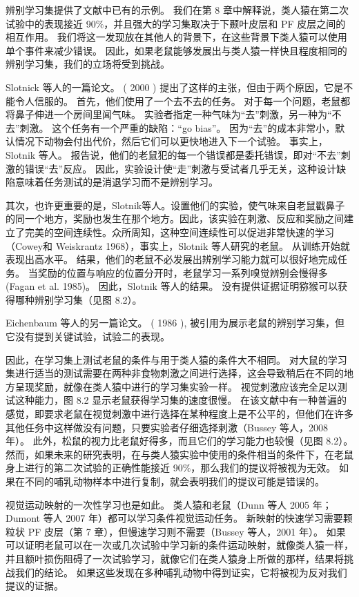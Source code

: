 \par 
辨别学习集提供了文献中已有的示例。 我们在第 8 章中解释说，类人猿在第二次试验中的表现接近 90$\%$，并且强大的学习集取决于下颞叶皮层和 PF 皮层之间的相互作用。 我们将这一发现放在其他人的背景下，在这些背景下类人猿可以使用单个事件来减少错误。 因此，如果老鼠能够发展出与类人猿一样快且程度相同的辨别学习集，我们的立场将受到挑战。
\par 
Slotnick 等人的一篇论文。 ( 2000 ) 提出了这样的主张，但由于两个原因，它是不能令人信服的。 首先，他们使用了一个去不去的任务。 对于每一个问题，老鼠都将鼻子伸进一个房间里闻气味。 实验者指定一种气味为“去”刺激，另一种为“不去”刺激。 这个任务有一个严重的缺陷：“go bias”。 因为“去”的成本非常小，默认情况下动物会付出代价，然后它们可以更快地进入下一个试验。 事实上，Slotnik 等人。 报告说，他们的老鼠犯的每一个错误都是委托错误，即对“不去”刺激的错误“去”反应。 因此，实验设计使“走”刺激与受试者几乎无关，这种设计缺陷意味着任务测试的是消退学习而不是辨别学习。
\par 
其次，也许更重要的是，Slotnik等人。设置他们的实验，使气味来自老鼠戳鼻子的同一个地方，奖励也发生在那个地方。因此，该实验在刺激、反应和奖励之间建立了完美的空间连续性。众所周知，这种空间连续性可以促进非常快速的学习（Cowey和 Weiskrantz 1968），事实上，Slotnik 等人研究的老鼠。 从训练开始就表现出高水平。 结果，他们的老鼠不必发展出辨别学习能力就可以很好地完成任务。 当奖励的位置与响应的位置分开时，老鼠学习一系列嗅觉辨别会慢得多 (Fagan et al. 1985)。 因此，Slotnik 等人的结果。 没有提供证据证明猕猴可以获得哪种辨别学习集（见图 8.2）。
\par 
Eichenbaum 等人的另一篇论文。 ( 1986 ), 被引用为展示老鼠的辨别学习集，但它没有提到关键试验，试验二的表现。
\par 
因此，在学习集上测试老鼠的条件与用于类人猿的条件大不相同。 对大鼠的学习集进行适当的测试需要在两种非食物刺激之间进行选择，这会导致稍后在不同的地方呈现奖励，就像在类人猿中进行的学习集实验一样。 视觉刺激应该完全足以测试这种能力，图 8.2 显示老鼠获得学习集的速度很慢。 在该文献中有一种普遍的感觉，即要求老鼠在视觉刺激中进行选择在某种程度上是不公平的，但他们在许多其他任务中这样做没有问题，只要实验者仔细选择刺激（Bussey 等人，2008 年）。 此外，松鼠的视力比老鼠好得多，而且它们的学习能力也较慢（见图 8.2）。 然而，如果未来的研究表明，在与类人猿实验中使用的条件相当的条件下，在老鼠身上进行的第二次试验的正确性能接近 90$\%$，那么我们的提议将被视为无效。 如果在不同的哺乳动物样本中进行复制，就会表明我们的提议可能是错误的。
\par 
视觉运动映射的一次性学习也是如此。 类人猿和老鼠（Dunn 等人 2005 年；Dumont 等人 2007 年）都可以学习条件视觉运动任务。 新映射的快速学习需要颗粒状 PF 皮层（第 7 章），但慢速学习则不需要（Bussey 等人，2001 年）。 如果可以证明老鼠可以在一次或几次试验中学习新的条件运动映射，就像类人猿一样，并且额叶损伤阻碍了一次试验学习，就像它们在类人猿身上所做的那样，结果将挑战我们的结论。 如果这些发现在多种哺乳动物中得到证实，它将被视为反对我们提议的证据。
